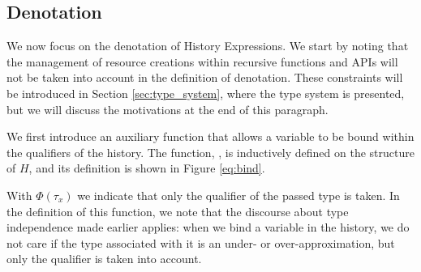 \subsection{Denotation}

We now focus on the denotation of History Expressions. We start by noting that the management of resource creations within recursive functions and APIs will not be taken into account in the definition of denotation. These constraints will be introduced in Section \ref{sec:type_system}, where the type system is presented, but we will discuss the motivations at the end of this paragraph.

We first introduce an auxiliary function that allows a variable to be bound within the qualifiers of the history. The function, \bind, is inductively defined on the structure of $H$, and its definition is shown in Figure \ref{eq:bind}.

With $\Phi(\tau_x)$ we indicate that only the qualifier of the passed type is taken. In the definition of this function, we note that the discourse about type independence made earlier applies: when we bind a variable in the history, we do not care if the type associated with it is an under- or over-approximation, but only the qualifier is taken into account.

